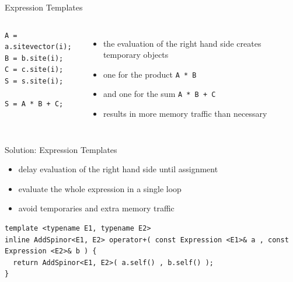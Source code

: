 \begin{frame}[fragile]{Expression Templates}

  \begin{columns}
      \begin{verbatim}
A = a.sitevector(i);
B = b.site(i);
C = c.site(i);
S = s.site(i);

S = A * B + C;
      \end{verbatim}
      \begin{itemize}
        \item the evaluation of the right hand side creates temporary objects
        \item one for the product \verb|A * B| 
        \item and one for the sum \verb|A * B + C|
        \item results in more memory traffic than necessary
      \end{itemize}
  \end{columns}

  \begin{bkalertblock}{Solution: Expression Templates}
    \begin{itemize}
      \item delay evaluation of the right hand side until assignment
      \item evaluate the whole expression in a single loop
      \item avoid temporaries and extra memory traffic
    \end{itemize}
  \end{bkalertblock}

  \begin{verbatim}
template <typename E1, typename E2>
inline AddSpinor<E1, E2> operator+( const Expression <E1>& a , const Expression <E2>& b ) {
  return AddSpinor<E1, E2>( a.self() , b.self() );
}
  \end{verbatim}

\end{frame}

